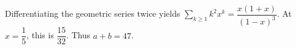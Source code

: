Differentiating the geometric series twice yields $\sum_{k\ge1}k^2x^k=\dfrac{x(1+x)}{(1-x)^3}$. At $x=\dfrac{1}{5}$, this is $\dfrac{15}{32}$. Thus $a+b=\boxed{47}$.
